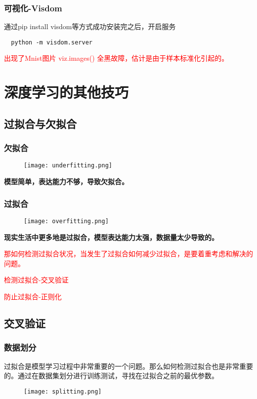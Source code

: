 \subsubsection{可视化-Visdom}
通过pip install visdom等方式成功安装完之后，开启服务
\begin{lstlisting}
  python -m visdom.server
\end{lstlisting}

\textcolor{red}{出现了Mnist图片 viz.images() 全黑故障，估计是由于样本标准化引起的。}




\newpage
\section{深度学习的其他技巧}
\subsection{过拟合与欠拟合}
\subsubsection{欠拟合}
\begin{figure}[!h]
  \centering
  \texttt{[image: underfitting.png]}
\end{figure}

\textbf{模型简单，表达能力不够，导致欠拟合。}

\subsubsection{过拟合}
\begin{figure}[!h]
  \centering
  \texttt{[image: overfitting.png]}
\end{figure}

\textbf{现实生活中更多地是过拟合，模型表达能力太强，数据量太少导致的。}

\textcolor{red}{那如何检测过拟合状况，当发生了过拟合如何减少过拟合，是要着重考虑和解决的问题。}

\textcolor{red}{检测过拟合-交叉验证}

\textcolor{red}{防止过拟合-正则化}

\newpage


\subsection{交叉验证}
\subsubsection{数据划分}
过拟合是模型学习过程中非常重要的一个问题。那么如何检测过拟合也是非常重要的。通过在数据集划分进行训练测试，寻找在过拟合之前的最优参数。
\begin{figure}[!h]
  \centering
  \texttt{[image: splitting.png]}
\end{figure}

